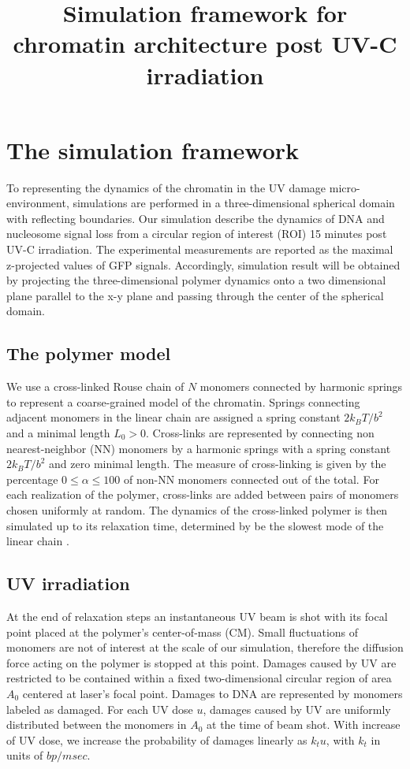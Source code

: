 \documentclass[12pt]{article}
\begin{document}
	
	\title{Simulation framework for chromatin architecture post UV-C irradiation}
\maketitle
\section{The simulation framework}
	To representing the dynamics of the chromatin in the UV damage micro-environment, simulations are performed in a three-dimensional spherical domain with reflecting boundaries. Our simulation describe the dynamics of DNA and nucleosome signal loss from a circular region of interest (ROI) 15 minutes post UV-C irradiation. The experimental measurements are reported as the maximal z-projected values of GFP signals. Accordingly, simulation result will be obtained by projecting the three-dimensional polymer dynamics onto a two dimensional plane parallel to the x-y plane and passing through the center of the spherical domain. 
	
	\subsection{The polymer model}
	We use a cross-linked Rouse chain of $N$ monomers connected by harmonic springs \cite{doi1988theory} to represent a coarse-grained model of the chromatin. Springs connecting adjacent monomers in the linear chain are assigned a spring constant $2k_BT/b^2$ and a minimal length $L_0>0$. Cross-links are represented by connecting non nearest-neighbor (NN) monomers by a harmonic springs with a spring constant $2k_BT/b^2$ and zero minimal length. The measure of cross-linking is given by the percentage $0\leq \alpha\leq 100$ of non-NN monomers connected out of the total. For each realization of the polymer, cross-links are added between pairs of monomers chosen uniformly at random. The dynamics of the cross-linked polymer is then simulated up to its relaxation time, determined by be the slowest mode of the linear chain \cite{doi1988theory}.

	\subsection{UV irradiation}
	At the end of relaxation steps an instantaneous UV beam is shot with its focal point placed at the polymer's center-of-mass (CM). Small fluctuations of monomers are not of interest at the scale of our simulation, therefore the diffusion force acting on the polymer is stopped at this point. Damages caused by UV are restricted to be contained within a fixed two-dimensional circular region of area $A_0$ centered at laser's focal point. Damages to DNA are represented by monomers labeled as damaged. For each UV dose $u$, damages caused by UV are uniformly distributed between the monomers in $A_0$ at the time of beam shot. With increase of UV dose, we increase the probability of damages linearly as $k_tu$, with $k_t$ in units of $bp/msec$. 
	
\end{document}

